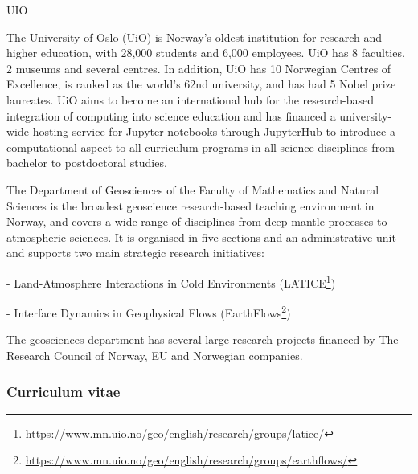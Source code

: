 \begin{sitedescription}{UIO}

The University of Oslo (UiO) is Norway's oldest institution for research and higher education, with 28,000 students and 6,000 employees. UiO has 8 faculties, 2 museums and several centres. In addition, UiO has 10 Norwegian Centres of Excellence,  is ranked as the world's 62nd university, and has had 5 Nobel prize laureates. UiO aims to become an international hub for the research-based integration of computing into science education and has financed a university-wide hosting service for Jupyter notebooks through JupyterHub  to introduce a computational aspect to all curriculum programs in all science disciplines from bachelor to postdoctoral studies.

The Department of Geosciences of the Faculty of Mathematics and Natural Sciences is the broadest geoscience research-based teaching environment in Norway, and covers a wide range of disciplines from deep mantle processes to atmospheric sciences. It is organised in five sections and an administrative unit and supports two main strategic research initiatives:

- Land-Atmosphere Interactions in Cold Environments (LATICE\footnote{\url{https://www.mn.uio.no/geo/english/research/groups/latice/}})

- Interface Dynamics in Geophysical Flows (EarthFlows\footnote{\url{https://www.mn.uio.no/geo/english/research/groups/earthflows/}})

 

 The geosciences department has several large research projects financed by The Research Council of Norway, EU and Norwegian companies.

\subsubsection*{Curriculum vitae}




%
%
%



\end{sitedescription}
